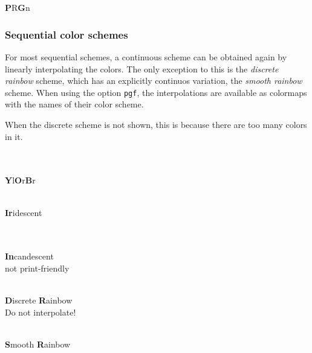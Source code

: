 \documentclass{scrartcl}
\begin{document}
\begin{center}
    \\
    \\
    \textbf{P}R\textbf{G}n
\end{center}\clearpage

\subsubsection{Sequential color schemes}\label{sec:T-S}
For most sequential schemes, a continuous scheme can be obtained again by linearly interpolating the colors.
The only exception to this is the \emph{discrete rainbow} scheme, which has an explicitly continuos variation, the \emph{smooth rainbow} scheme.
When using the option \texttt{pgf}, the interpolations are available as colormaps with the names of their color scheme.

When the discrete scheme is not shown, this is because there are too many colors in it.

\begin{center}
    \\
    \\
    \textbf{Y}l\textbf{O}r\textbf{B}r
\end{center}

\begin{center}
    \\
    \textbf{Ir}idescent
\end{center}

\begin{center}
    \\
    \\
    \textbf{In}candescent\\
    not print-friendly
\end{center}

\begin{center}
    \\
    \textbf{D}iscrete \textbf{R}ainbow\\
    Do not interpolate!
\end{center}

\begin{center}
    \\
    \textbf{S}mooth \textbf{R}ainbow\\
\end{center}\clearpage
\end{document}

